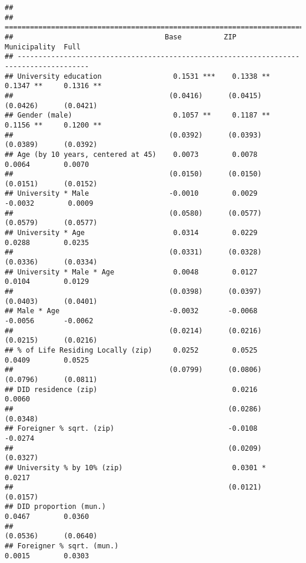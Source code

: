 \documentclass[
]{article}
\begin{document}
\begin{verbatim}
## 
## =======================================================================================
##                                    Base          ZIP          Municipality  Full       
## ---------------------------------------------------------------------------------------
## University education                 0.1531 ***    0.1338 **    0.1347 **     0.1316 **
##                                     (0.0416)      (0.0415)     (0.0426)      (0.0421)  
## Gender (male)                        0.1057 **     0.1187 **    0.1156 **     0.1200 **
##                                     (0.0392)      (0.0393)     (0.0389)      (0.0392)  
## Age (by 10 years, centered at 45)    0.0073        0.0078       0.0064        0.0070   
##                                     (0.0150)      (0.0150)     (0.0151)      (0.0152)  
## University * Male                   -0.0010        0.0029      -0.0032        0.0009   
##                                     (0.0580)      (0.0577)     (0.0579)      (0.0577)  
## University * Age                     0.0314        0.0229       0.0288        0.0235   
##                                     (0.0331)      (0.0328)     (0.0336)      (0.0334)  
## University * Male * Age              0.0048        0.0127       0.0104        0.0129   
##                                     (0.0398)      (0.0397)     (0.0403)      (0.0401)  
## Male * Age                          -0.0032       -0.0068      -0.0056       -0.0062   
##                                     (0.0214)      (0.0216)     (0.0215)      (0.0216)  
## % of Life Residing Locally (zip)     0.0252        0.0525       0.0409        0.0525   
##                                     (0.0799)      (0.0806)     (0.0796)      (0.0811)  
## DID residence (zip)                                0.0216                     0.0060   
##                                                   (0.0286)                   (0.0348)  
## Foreigner % sqrt. (zip)                           -0.0108                    -0.0274   
##                                                   (0.0209)                   (0.0327)  
## University % by 10% (zip)                          0.0301 *                   0.0217   
##                                                   (0.0121)                   (0.0157)  
## DID proportion (mun.)                                           0.0467        0.0360   
##                                                                (0.0536)      (0.0640)  
## Foreigner % sqrt. (mun.)                                        0.0015        0.0303   

\end{verbatim}
\end{document}
